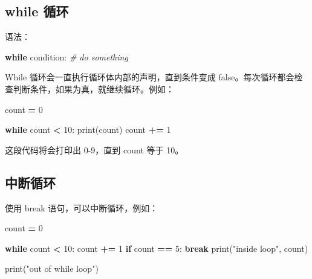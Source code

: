 \documentclass[]{ctexbook}
\newenvironment{Shaded}{\begin{snugshade}}{\end{snugshade}}
\newcommand{\BuiltInTok}[1]{#1}
\newcommand{\CommentTok}[1]{\textcolor[rgb]{0.56,0.35,0.01}{\textit{#1}}}
\newcommand{\ControlFlowTok}[1]{\textcolor[rgb]{0.13,0.29,0.53}{\textbf{#1}}}
\newcommand{\DecValTok}[1]{\textcolor[rgb]{0.00,0.00,0.81}{#1}}
\newcommand{\NormalTok}[1]{#1}
\newcommand{\OperatorTok}[1]{\textcolor[rgb]{0.81,0.36,0.00}{\textbf{#1}}}
\newcommand{\StringTok}[1]{\textcolor[rgb]{0.31,0.60,0.02}{#1}}
\begin{document}
\hypertarget{while-ux5faaux73af}{%
\subsection{while 循环}\label{while-ux5faaux73af}}

语法：

\begin{Shaded}
\begin{Highlighting}[]
\ControlFlowTok{while}\NormalTok{ condition:}
    \CommentTok{# do something}
\end{Highlighting}
\end{Shaded}

While 循环会一直执行循环体内部的声明，直到条件变成 false。每次循环都会检查判断条件，如果为真，就继续循环。例如：

\begin{Shaded}
\begin{Highlighting}[]
\NormalTok{count }\OperatorTok{=} \DecValTok{0}

\ControlFlowTok{while}\NormalTok{ count }\OperatorTok{<} \DecValTok{10}\NormalTok{:}
    \BuiltInTok{print}\NormalTok{(count)}
\NormalTok{    count }\OperatorTok{+=} \DecValTok{1}
\end{Highlighting}
\end{Shaded}

这段代码将会打印出 0-9，直到 count 等于 10。

\hypertarget{ux4e2dux65adux5faaux73af}{%
\subsection{中断循环}\label{ux4e2dux65adux5faaux73af}}

使用 break 语句，可以中断循环，例如：

\begin{Shaded}
\begin{Highlighting}[]
\NormalTok{count }\OperatorTok{=} \DecValTok{0}

\ControlFlowTok{while}\NormalTok{ count }\OperatorTok{<} \DecValTok{10}\NormalTok{:}
\NormalTok{    count }\OperatorTok{+=} \DecValTok{1}
    \ControlFlowTok{if}\NormalTok{ count }\OperatorTok{==} \DecValTok{5}\NormalTok{:}
        \ControlFlowTok{break}
    \BuiltInTok{print}\NormalTok{(}\StringTok{"inside loop"}\NormalTok{, count)}

\BuiltInTok{print}\NormalTok{(}\StringTok{"out of while loop"}\NormalTok{)}
\end{Highlighting}
\end{Shaded}
\end{document}

